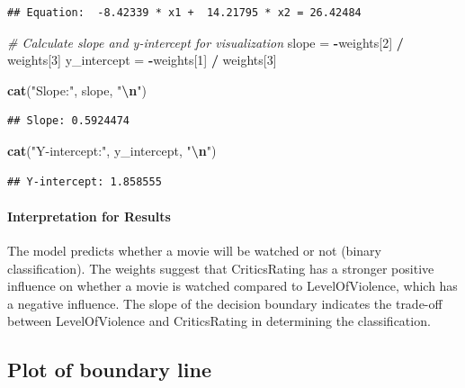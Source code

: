 \documentclass[
]{article}
\newenvironment{Shaded}{\begin{snugshade}}{\end{snugshade}}
\newcommand{\CommentTok}[1]{\textcolor[rgb]{0.56,0.35,0.01}{\textit{#1}}}
\newcommand{\DecValTok}[1]{\textcolor[rgb]{0.00,0.00,0.81}{#1}}
\newcommand{\FunctionTok}[1]{\textcolor[rgb]{0.13,0.29,0.53}{\textbf{#1}}}
\newcommand{\NormalTok}[1]{#1}
\newcommand{\OtherTok}[1]{\textcolor[rgb]{0.56,0.35,0.01}{#1}}
\newcommand{\SpecialCharTok}[1]{\textcolor[rgb]{0.81,0.36,0.00}{\textbf{#1}}}
\newcommand{\StringTok}[1]{\textcolor[rgb]{0.31,0.60,0.02}{#1}}
\begin{document}
\begin{verbatim}
## Equation:  -8.42339 * x1 +  14.21795 * x2 = 26.42484
\end{verbatim}

\begin{Shaded}
\begin{Highlighting}[]
\CommentTok{\# Calculate slope and y{-}intercept for visualization}
\NormalTok{slope }\OtherTok{=} \SpecialCharTok{{-}}\NormalTok{weights[}\DecValTok{2}\NormalTok{] }\SpecialCharTok{/}\NormalTok{ weights[}\DecValTok{3}\NormalTok{]}
\NormalTok{y\_intercept }\OtherTok{=} \SpecialCharTok{{-}}\NormalTok{weights[}\DecValTok{1}\NormalTok{] }\SpecialCharTok{/}\NormalTok{ weights[}\DecValTok{3}\NormalTok{]}

\FunctionTok{cat}\NormalTok{(}\StringTok{"Slope:"}\NormalTok{, slope, }\StringTok{"}\SpecialCharTok{\textbackslash{}n}\StringTok{"}\NormalTok{)}
\end{Highlighting}
\end{Shaded}

\begin{verbatim}
## Slope: 0.5924474
\end{verbatim}

\begin{Shaded}
\begin{Highlighting}[]
\FunctionTok{cat}\NormalTok{(}\StringTok{"Y{-}intercept:"}\NormalTok{, y\_intercept, }\StringTok{"}\SpecialCharTok{\textbackslash{}n}\StringTok{"}\NormalTok{)}
\end{Highlighting}
\end{Shaded}

\begin{verbatim}
## Y-intercept: 1.858555
\end{verbatim}

\paragraph{Interpretation for Results}\label{interpretation-for-results}

The model predicts whether a movie will be watched or not (binary
classification). The weights suggest that CriticsRating has a stronger
positive influence on whether a movie is watched compared to
LevelOfViolence, which has a negative influence. The slope of the
decision boundary indicates the trade-off between LevelOfViolence and
CriticsRating in determining the classification.

\subsection{Plot of boundary line}\label{plot-of-boundary-line}
\end{document}
